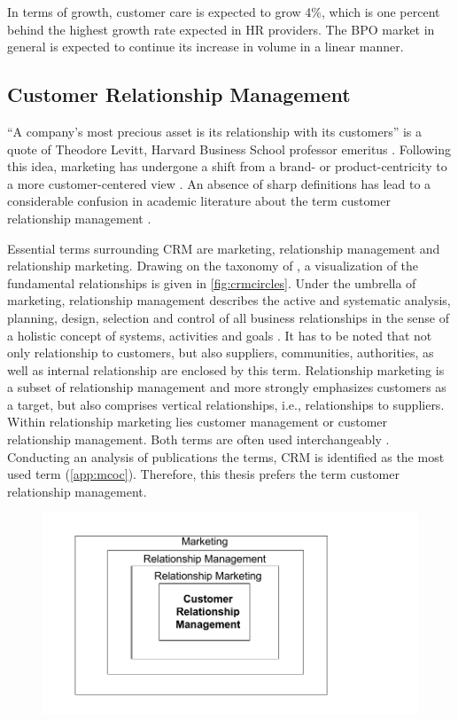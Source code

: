 		In terms of growth, customer care is expected to grow 4\%, which is one percent behind the highest growth rate expected in HR providers. The \acrshort{BPO} market in general is expected to continue its increase in volume in a linear manner. 
		\subsection{Customer Relationship Management}
		\label{sec:crm}
		\enquote{A company's most precious asset is its relationship with its customers} is a quote of Theodore Levitt, Harvard Business School professor emeritus \citep{levitt1983}. Following this idea, marketing has undergone a shift from a brand- or product-centricity to a more customer-centered view \citep{Chen_2003}. An absence of sharp definitions has lead to a considerable confusion in academic literature about the term customer relationship management \citep{paynefrow2005}. 
		
		Essential terms surrounding CRM are marketing, relationship management and relationship marketing. Drawing on the taxonomy of \citep{Leuer2011}, a visualization of the fundamental relationships is given in \Fig \ref{fig:crmcircles}. Under the umbrella of marketing, relationship management describes the active and systematic analysis, planning, design, selection and control of all business relationships in the sense of a holistic concept of systems, activities and goals \citep[]{diller1995}. It has to be noted that not only relationship to customers, but also suppliers, communities, authorities, as well as internal relationship are enclosed by this term. Relationship marketing is a subset of relationship management and more strongly emphasizes customers as a target, but also comprises vertical relationships, i.e., relationships to suppliers. Within relationship marketing lies customer management or customer relationship management. Both terms are often used interchangeably  \citep{Leuer2011,ryals2001customer}. Conducting an analysis of publications \wrt the terms, \acrshort{CRM} is identified as the most used term (\cf \ref{app:mcoc}). Therefore, this thesis prefers the term customer relationship management.
		
		\begin{figure}[caption={CRM in the field of marketing}, label={fig:crmcircles}]
			{	\includegraphics[width=.8\textwidth]{figures/crmcircles.pdf}}
		\end{figure}
	
